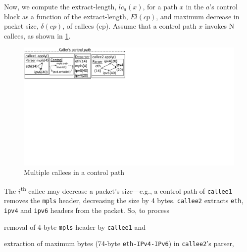 \documentclass[letterpaper,twocolumn,10pt]{article}
\begin{document}

Now, we compute the extract-length, $lc_{a}(x)$, for a path $x$ in the
\uprogram $a$'s control block as a function of the extract-length,
$El(cp)$, and maximum decrease in packet size, $\delta(cp)$, of
callees (cp). Assume that a control path $x$ invokes N callees, as
shown in \cref{fig:sequential-callees}.
\begin{figure}[!tbp]
    \centering
    \includegraphics[trim=0 396 487 0, clip,scale=0.5]{sequential-callees}
    \caption{Multiple callees in a control path}
    \label{fig:sequential-callees}
\end{figure}
The $i$\textsuperscript{th} callee may decrease a packet's
size---e.g., a control path of \texttt{callee1} removes the
\texttt{mpls} header, decreasing the size by 4
bytes.  \texttt{callee2} extracts \texttt{eth}, \texttt{ipv4} and
\texttt{ipv6} headers from the packet. So, to
process
\begin{enumerate*}[label=(\roman*)]
  \item removal of 4-byte \texttt{mpls} header by \texttt{callee1} and
  \item extraction of maximum bytes (74-byte \texttt{eth-IPv4-IPv6})
    in \texttt{callee2}'s parser,
\end{enumerate*}
\end{document}
